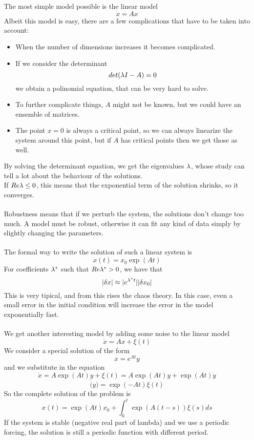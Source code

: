 The most simple model possible is the linear model
$$
	\dot{x} = Ax
$$
Albeit this model is easy, there are a few complications that have to be taken into account:
\begin{itemize}
	\item When the number of dimensions increases it becomes complicated. 
	\item If we consider the determinant
$$
	det(\lambda I - A) = 0
$$
we obtain a polinomial equation, that can be very hard to solve. 
	\item To further complicate things, $A$ might not be known, but we could have an ensemble of matrices. 
	\item The point $x=0$ is always a critical point, so we can always linearize the system around this point, but if $A$ has critical points then we get those as well. 
\end{itemize}
By solving the determinant equation, we get the eigenvalues $\lambda$, whose study can tell a lot about the behaviour of the solutions. \\
If $Re \lambda \leq 0$, this means that the exponential term of the solution shrinks, so it converges. \\ \\
Robustness means that if we perturb the system, the solutions don't change too much. A model must be robust, otherwise it can fit any kind of data simply by slightly changing the parameters. \\ \\
The formal way to write the solution of such a linear system is
$$
	x(t) = x_0\exp(At)
$$
For coefficients $\lambda^*$ such that $Re\lambda^* > 0$, we have that
$$
	|\delta x| \approx |e^{\lambda^* t}||\delta x_0|
$$
This is very tipical, and from this rises the chaos theory. In this case, even a small error in the initial condition will increase the error in the model exponentially fast. \\ \\
We get another interesting model by adding some noise to the linear model
$$
	\dot{x} = Ax + \xi(t)
$$
We consider a special solution of the form
$$
	x = e^{At}y
$$		
and we substitute in the equation
$$
	\dot{x} = A\exp(At)y + \xi(t) = A\exp(At)y + \exp(At)\dot{y}
$$	
$$
	\dot(y) = \exp(-At)\xi(t)
$$
So the complete solution of the problem is
\begin{equation}
	x(t) = \exp(At)x_0 + \int_0^t \exp(A(t-s))\xi(s)ds
\end{equation}
If the system is stable (negative real part of lambda) and we use a periodic forcing, the solution is still a periodic function with different period. \\ \\
